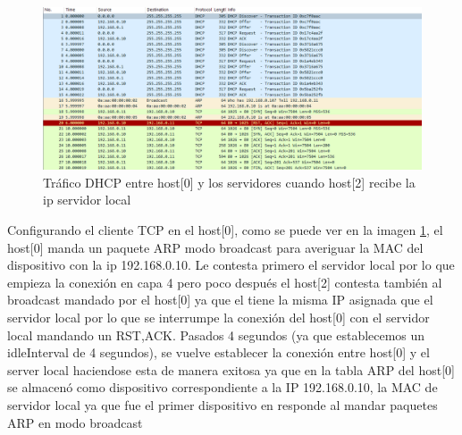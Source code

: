 \begin{figure}[!ht]
    \centering
    \includegraphics[width=135mm, scale=0.75]{imaxes/captura_ejer1_5.png}
    \caption{Tráfico DHCP entre host[0] y los servidores cuando host[2] recibe la ip servidor local}
    \label{fig:captura2_host0}
\end{figure}

Configurando el cliente TCP en el host[0], como se puede ver en la imagen \ref{fig:captura2_host0}, el host[0] manda un paquete ARP modo broadcast para averiguar la MAC del dispositivo con la ip 192.168.0.10. Le contesta primero el servidor local por lo que empieza la conexión en capa 4 pero poco después el host[2] contesta también al broadcast mandado por el host[0] ya que el tiene la misma IP asignada que el servidor local por lo que se interrumpe la conexión del host[0] con el servidor local mandando un RST,ACK. Pasados 4 segundos (ya que establecemos un idleInterval de 4 segundos), se vuelve establecer la conexión entre host[0] y el server local haciendose esta de manera exitosa ya que en la tabla ARP del host[0] se almacenó como dispositivo correspondiente a la IP 192.168.0.10, la MAC de servidor local ya que fue el primer dispositivo en responde al mandar paquetes ARP en modo broadcast 
